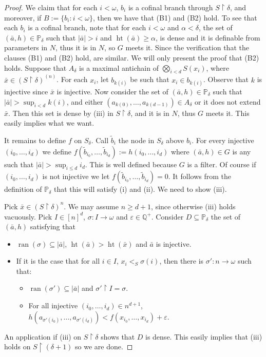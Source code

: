 \documentclass{amsart}
\theoremstyle{definition}
\renewcommand{\P}{\mathbb{P}}
\newcommand{\Q}{\mathbb{Q}}
\newcommand{\seb}{\subseteq}
\newcommand{\res}{\restriction}
\DeclareMathOperator{\ran}{ran}
\DeclareMathOperator{\hht}{ht}
\begin{document}
\begin{proof}
  We claim that for each $i < \omega$, $b_{i}$ is a cofinal branch
  through $S \res \delta$, and moreover, if
  $B := \{b_{i} : i< \omega\}$, then  we have that (B1) and (B2) hold.
  To see that each $b_{i}$ is a cofinal branch,
  note that for each $i < \omega$
  and $\alpha < \delta$, the set of $(\bar{a},h) \in \P_{\delta}$ such that
  $|\bar{a}| > i$ and $\hht(\bar{a}) \ge \alpha$, is dense and it
  is definable from parameters in $N$, thus it is in $N$, so
  $G$ meets it. Since the  verification that the  clauses  (B1) and (B2) hold, are similar.
  We will only present the proof that (B2) holds. Suppose that $A_{\delta}$ is a maximal
  antichain of $\bigotimes_{i < d}S(x_{i})$, where
  $\bar{x} \in (S\res \delta)^{(n)}$. For each $x_{i}$, let
  $b_{k(i)}$ be such that $x_{i} \in b_{k(i)}$. Observe that
  $k$ is injective since $\bar{x}$ is injective. Now consider the
  set of $(\bar{a},h) \in \P_{\delta}$ such that
  $|\bar{a}| > \sup_{i < d}k(i)$,
  and either $(a_{k(0)},\dots,a_{k(d-1)}) \in A_{\delta}$ or
  it does not extend $\bar{x}$. Then this set is dense by (iii) in
  $S \res \delta$,
  and it is in $N$, thus $G$ meets it. This easily implies what we want.

  It remains to define $f$ on $S_{\delta}$. Call
  $\tilde{b}_{i}$ the node in $S_{\delta}$ above $b_{i}$.
  For every injective $(i_{0},\dots,i_{d})$ we define
  $f(\tilde{b}_{i_{0}},\dots,\tilde{b}_{i_{d}}) := h(i_{0},\dots,i_{d})$
  where $(\bar{a},h) \in G$ is any such that $|\bar{a}| > \sup_{i \le d}i_{d}$.
  This is well defined because $G$ is a filter. Of course if $(i_{0},\dots,i_{d})$
  is not injective we let $f(\tilde{b}_{i_{0}},\dots,\tilde{b}_{i_{d}}) = 0$.
  It follows
  from the definition of $\P_{\delta}$ that this will satisfy
  (i) and (ii). We need to show (iii).

  Pick $\bar{x} \in (S\res \delta)^{n}$. We may assume $n \ge d+1$,
  since otherwise (iii) holds vacuously. Pick $I \in [n]^{d}$,
  $\sigma : I \to \omega$ and $\varepsilon \in \Q^{+}$.
  Consider $D \seb \P_{\delta}$ the set of $(\bar{a},h)$ satisfying that
  \begin{itemize}
    \item $\ran(\sigma) \seb |\bar{a}|$, $\hht(\bar{a}) > \hht(\bar{x})$ and
    $\bar{a}$ is injective.
    \item If it is the case that for all $i \in I$, $x_{i} <_{S} \sigma(i)$,
    then there is $\sigma' : n \to \omega$ such that:
    \begin{itemize}
      \item $\ran(\sigma') \seb |\bar{a}|$ and $\sigma' \res I = \sigma$.
      \item For all injective $(i_{0},\dots,i_{d}) \in n^{d+1}$,
  $h(a_{\sigma'(i_{0})},\dots,a_{\sigma'(i_{d})}) < f(x_{i_{0}},\dots,x_{i_{d}}) + \varepsilon$.
    \end{itemize}
  \end{itemize}
  An application if (iii) on $S \res \delta$ shows that $D$ is dense.
  This easily implies that (iii) holds on $S \res (\delta +1)$ so
  we are done.
\end{proof}
\end{document}
